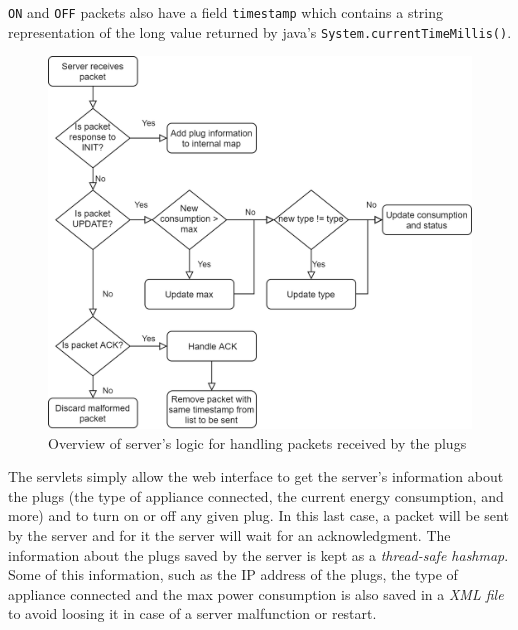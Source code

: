 \documentclass[conference]{IEEEtran}
\begin{document}
\verb|ON| and \verb|OFF| packets also have a field \verb|timestamp| which contains a string representation of the long value returned by java's \verb|System.currentTimeMillis()|.  
\begin{figure}
	\centering
	\includegraphics[width=\linewidth]{assets/server_logic}
	\caption{Overview of server's logic for handling packets received by the plugs}
	\label{fig:server_logic}
\end{figure}
The servlets simply allow the web interface to get the server's information about the plugs (the type of appliance connected, the current energy consumption, and more) and to turn on or off any given plug. In this last case, a packet will be sent by the server and for it the server will wait for an acknowledgment. The information about the plugs saved by the server is kept as a \textit{thread-safe hashmap}. Some of this information, such as the IP address of the plugs, the type of appliance connected and the max power consumption is also saved in a \textit{XML file} to avoid loosing it in case of a server malfunction or restart.
\end{document}
